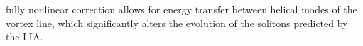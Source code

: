 \documentclass[aps,graphicx,reprint,onecolumn,12pt,tightenlines,longbibliography]{revtex4-1}
\newcommand{\sas}[2]{{#2}}
\begin{document}
fully nonlinear correction allows for energy transfer between helical modes of the vortex line, which significantly alters the evolution of the solitons predicted by the \sas{integrable cubic base}{LIA}.  
\end{document}
